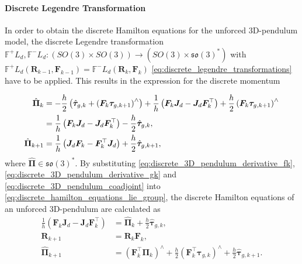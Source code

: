 \paragraph{Discrete Legendre Transformation}

In order to obtain the discrete Hamilton equations for the unforced 3D-pendulum model, the discrete Legendre transformation $\mathbb{F}^+L_d, \mathbb{F}^-L_d:(SO(3)\times SO(3)) \to (SO(3) \times \mathfrak{so}(3)^*)$ with $\mathbb{F}^+L_d(\bm{R}_{k-1}, \bm{F}_{k-1}) = \mathbb{F}^-L_d(\bm{R}_k, \bm{F}_k)$ \eqref{eq:discrete_legendre_transformations} have to be applied. This results in the expression for the discrete momentum

\begin{subequations}\label{eq:discrete_3D_pendulum_momentum}
\begin{align}
    \hat{\bm{\Pi}}_k
    &=
    -\frac{h}{2}\left(
        \hat{\bm{\tau}}_{g,k}
        + \left(\bm{F}_k\bm{\tau}_{g,k+1}\right)^\wedge
    \right)
    +
    \frac{1}{h}\left(
        \bm{F}_k\bm{J}_d
        - \bm{J}_d\bm{F}_k^{\top}
    \right)
    +
    \frac{h}{2}\left(\bm{F}_k\bm{\tau}_{g,k+1}\right)^\wedge
    \notag \\
    &=
    \frac{1}{h}\left(
        \bm{F}_k\bm{J}_d
        - \bm{J}_d\bm{F}_k^{\top}
    \right)
    - \frac{h}{2}\hat{\bm{\tau}}_{g,k}, \label{eq:discrete_3D_pendulum_momentum_1} \\
    \hat{\bm{\Pi}}_{k+1}
    &=
    \frac{1}{h}\left(
        \bm{J}_d\bm{F}_k
        - \bm{F}_k^{\top}\bm{J}_d
    \right)
    + \frac{h}{2}\hat{\bm{\tau}}_{g,k+1},\label{eq:discrete_3D_pendulum_momentum_2}
\end{align}
\end{subequations}
where $ \hat{\bm{\Pi}} \in \mathfrak{so}(3)^*$. By substituting \eqref{eq:discrete_3D_pendulum_derivative_fk}, \eqref{eq:discrete_3D_pendulum_derivative_gk} and \eqref{eq:discrete_3D_pendulum_coadjoint} into \eqref{eq:discrete_hamilton_equations_lie_group}, the discrete Hamilton equations of an unforced 3D-pendulum are calculated as
\begin{subequations}\label{eq:discrete_3D_pendulum_hamilton}
\begin{align}
    \label{eq:discrete_3D_pendulum_hamilton_1}
     \frac{1}{h}\left(
        \bm{F}_k \bm{J}_d
        - \bm{J}_d \bm{F}_k^{\top}
    \right)
    &=
    \hat{\bm{\Pi}}_k
    + \frac{h}{2}\hat{\bm{\tau}}_{g,k} ,\\
    \label{eq:discrete_3D_pendulum_hamilton_2}
    \bm{R}_{k+1}
    &=
    \bm{R}_k \bm{F}_k ,\\
    \label{eq:discrete_3D_pendulum_hamilton_3}
    \hat{\bm{\Pi}}_{k+1}
    &=
    (\bm{F}_k^\top \bm{\Pi}_k)^\wedge
    + \frac{h}{2}(\bm{F}_k^\top \bm{\tau}_{g,k})^\wedge
    + \frac{h}{2}\hat{\bm{\tau}}_{g,k+1}.
\end{align}
\end{subequations}
